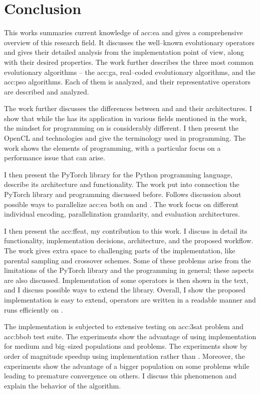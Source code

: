 \chapter{Conclusion}

This works summaries current knowledge of \acrlong*{acc:ea} and gives a comprehensive overview of this research field. It discusses the well--known evolutionary operators and gives their detailed analysis from the implementation point of view, along with their desired properties. The work further describes the three most common evolutionary algorithms -- the \acrlong{acc:ga}, real--coded evolutionary algorithms, and the \acrlong{acc:pso} algorithms. Each of them is analyzed, and their representative operators are described and analyzed.

The work further discusses the differences between \cpu and \gpu and their architectures. I show that while the \gpu has its application in various fields mentioned in the work, the mindset for programming on \gpu is considerably different. I then present the OpenCL and \cuda technologies and give the terminology used in \gpu programming. The work shows the elements of \cuda programming, with a particular focus on a performance issue that can arise. 

I then present the PyTorch library for the Python programming language, describe its architecture and functionality. The work put into connection the PyTorch library and \cuda programming discussed before. Follows discussion about possible ways to parallelize \acrlong{acc:ea} both on \cpu and \gpuns. The work focus on different individual encoding, parallelization granularity, and evaluation architectures.

I then present the \acrfull{acc:ffeat}, my contribution to this work. I discuss in detail its functionality, implementation decisions, architecture, and the proposed workflow. The work gives extra space to challenging parts of the implementation, like parental sampling and crossover schemes. Some of these problems arise from the limitations of the PyTorch library and the \cuda programming in general; these aspects are also discussed. Implementation of some operators is then shown in the text, and I discuss possible ways to extend the library. Overall, I show the proposed implementation is easy to extend, operators are written in a readable manner and runs efficiently on \gpuns.

The implementation is subjected to extensive testing on \acrshort{acc:3sat} problem and \acrshort{acc:bbob} test suite. The experiments show the advantage of using \cuda implementation for medium and big--sized populations and problems. The experiments show by order of magnitude speedup using \cuda implementation rather than \cpuns. Moreover, the experiments show the advantage of a bigger population on some problems while leading to premature convergence on others. I discuss this phenomenon and explain the behavior of the algorithm.


